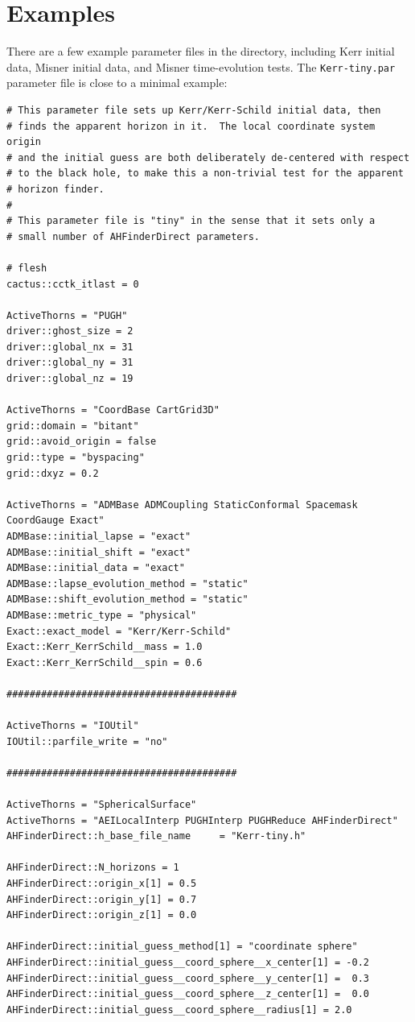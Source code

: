 
\section{Examples}
\label{AHFinderDirect/sect-examples}

There are a few example parameter files in the  directory,
including Kerr initial data, Misner initial data, and Misner time-evolution
tests.  The \verb|Kerr-tiny.par| parameter file is close to a minimal
 example:

\begin{verbatim}
# This parameter file sets up Kerr/Kerr-Schild initial data, then
# finds the apparent horizon in it.  The local coordinate system origin
# and the initial guess are both deliberately de-centered with respect
# to the black hole, to make this a non-trivial test for the apparent
# horizon finder.
#
# This parameter file is "tiny" in the sense that it sets only a
# small number of AHFinderDirect parameters.

# flesh
cactus::cctk_itlast = 0

ActiveThorns = "PUGH"
driver::ghost_size = 2
driver::global_nx = 31
driver::global_ny = 31
driver::global_nz = 19

ActiveThorns = "CoordBase CartGrid3D"
grid::domain = "bitant"
grid::avoid_origin = false
grid::type = "byspacing"
grid::dxyz = 0.2

ActiveThorns = "ADMBase ADMCoupling StaticConformal Spacemask CoordGauge Exact"
ADMBase::initial_lapse = "exact"
ADMBase::initial_shift = "exact"
ADMBase::initial_data = "exact"
ADMBase::lapse_evolution_method = "static"
ADMBase::shift_evolution_method = "static"
ADMBase::metric_type = "physical"
Exact::exact_model = "Kerr/Kerr-Schild"
Exact::Kerr_KerrSchild__mass = 1.0
Exact::Kerr_KerrSchild__spin = 0.6

########################################

ActiveThorns = "IOUtil"
IOUtil::parfile_write = "no"

########################################

ActiveThorns = "SphericalSurface"
ActiveThorns = "AEILocalInterp PUGHInterp PUGHReduce AHFinderDirect"
AHFinderDirect::h_base_file_name     = "Kerr-tiny.h"

AHFinderDirect::N_horizons = 1
AHFinderDirect::origin_x[1] = 0.5
AHFinderDirect::origin_y[1] = 0.7
AHFinderDirect::origin_z[1] = 0.0

AHFinderDirect::initial_guess_method[1] = "coordinate sphere"
AHFinderDirect::initial_guess__coord_sphere__x_center[1] = -0.2
AHFinderDirect::initial_guess__coord_sphere__y_center[1] =  0.3
AHFinderDirect::initial_guess__coord_sphere__z_center[1] =  0.0
AHFinderDirect::initial_guess__coord_sphere__radius[1] = 2.0
\end{verbatim}

